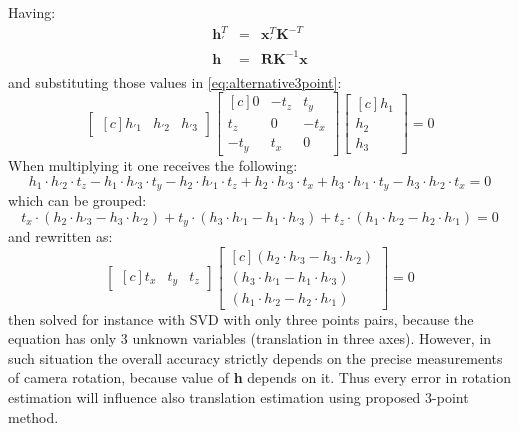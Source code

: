 Having:
\begin{equation} \label{eq:leftRelative}
\begin{array}{lcl}
\textbf{h}_{'}^{T} &=& \textbf{x}_{'}^{T}\textbf{K}^{-T} \\
\textbf{h} &=& \textbf{R}\textbf{K}^{-1}\textbf{x} \\
\end{array}
\end{equation}
and substituting those values in \ref{eq:alternative3point}:
\begin{equation} \label{eq:alternative3point}
\begin{bmatrix*}[c]
h_{'1} & h_{'2} & h_{'3}
\end{bmatrix*}\begin{bmatrix*}[c]
 0 & -t_{z} & t_{y}\\
 t_{z} & 0 & -t_{x}\\
-t_{y} & t_{x} & 0 
\end{bmatrix*}\begin{bmatrix*}[c]
h_{1} \\
h_{2} \\
h_{3}
\end{bmatrix*}
= 0
\end{equation}
When multiplying it one receives the following:
\begin{equation} \label{eq:alternative3point}
h_{1}\cdot h_{'2}\cdot t_{z} - h_{1}\cdot h_{'3}\cdot t_{y} - h_{2}\cdot h_{'1}\cdot t_{z} + h_{2}\cdot h_{'3}\cdot t_{x} + h_{3}\cdot h_{'1}\cdot t_{y} - h_{3}\cdot h_{'2}\cdot t_{x}
= 0
\end{equation}
which can be grouped:
\begin{equation}
t_{x} \cdot  (h_{2}\cdot h_{'3} - h_{3}\cdot h_{'2}) + t_{y} \cdot  (h_{3}\cdot h_{'1} - h_{1}\cdot h_{'3}) + t_{z} \cdot  (h_{1}\cdot h_{'2} - h_{2}\cdot h_{'1}) = 0
\end{equation}
and rewritten as:
\begin{equation} \label{eq:translation3point}
\begin{bmatrix*}[c]
t_{x} &
t_{y} &
t_{z}
\end{bmatrix*}\begin{bmatrix*}[c]
(h_{2}\cdot h_{'3} - h_{3}\cdot h_{'2}) \\ 
(h_{3}\cdot h_{'1} - h_{1}\cdot h_{'3}) \\
(h_{1}\cdot h_{'2} - h_{2}\cdot h_{'1}) 
\end{bmatrix*} 
= 0
\end{equation}
then solved for instance with SVD with only three points pairs, because the equation has only 3 unknown variables (translation in three axes). However, in such situation the overall accuracy strictly depends on the precise measurements of camera rotation, because value of \textbf{h} depends on it. Thus every error in rotation estimation will influence also translation estimation using proposed 3-point method.
